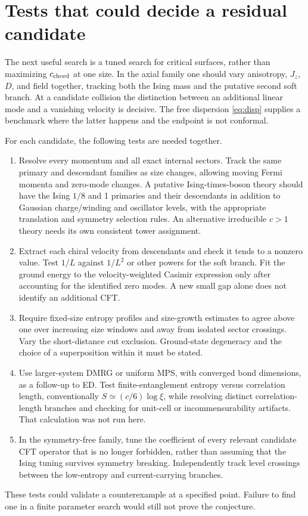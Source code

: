 \documentclass[11pt]{article}
\begin{document}
\section{Tests that could decide a residual candidate}

The next useful search is a tuned search for critical surfaces, rather than
maximizing $c_{\rm chord}$ at one size. In the axial family one should vary
anisotropy, $J_z$, $D$, and field together, tracking both the Ising mass and
the putative second soft branch. At a candidate collision the distinction
between an additional linear mode and a vanishing velocity is decisive.
The free dispersion \eqref{eq:disp} supplies a benchmark where the latter
happens and the endpoint is not conformal.

For each candidate, the following tests are needed together.
\begin{enumerate}
\item Resolve every momentum and all exact internal sectors. Track the same
primary and descendant families as size changes, allowing moving Fermi
momenta and zero-mode changes. A putative Ising-times-boson theory should
have the Ising $1/8$ and 1 primaries and their descendants in addition to
Gaussian charge/winding and oscillator levels, with the appropriate
translation and symmetry selection rules. An alternative irreducible
$c>1$ theory needs its own consistent tower assignment.
\item Extract each chiral velocity from descendants and check it tends to
a nonzero value. Test $1/L$ against $1/L^2$ or other powers for the soft
branch. Fit the ground energy to the velocity-weighted Casimir expression
only after accounting for the identified zero modes. A new small gap alone
does not identify an additional CFT.
\item Require fixed-size entropy profiles and size-growth estimates to
agree above one over increasing size windows and away from isolated
sector crossings. Vary the short-distance cut exclusion. Ground-state
degeneracy and the choice of a superposition within it must be stated.
\item Use larger-system DMRG or uniform MPS, with converged bond dimensions,
as a follow-up to ED. Test finite-entanglement entropy versus correlation
length, conventionally $S\simeq(c/6)\log\xi$, while resolving distinct
correlation-length branches and checking for unit-cell or incommensurability
artifacts. That calculation was not run here.
\item In the symmetry-free family, tune the coefficient of every relevant
candidate CFT operator that is no longer forbidden, rather than assuming
that the Ising tuning survives symmetry breaking. Independently track
level crossings between the low-entropy and current-carrying branches.
\end{enumerate}
These tests could validate a counterexample at a specified point. Failure to
find one in a finite parameter search would still not prove the conjecture.
\end{document}
